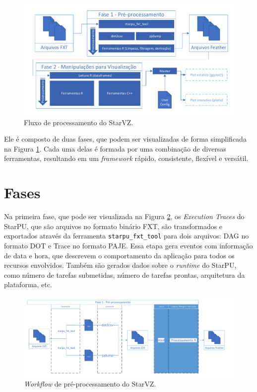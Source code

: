 \begin{figure}[ht]
 \centerline{\includegraphics[width=1\textwidth]{./img/all-proc.pdf}}
 \caption{Fluxo de processamento do StarVZ.}
 \label{fig:starvz-workflow-general}
\end{figure}

Ele é composto de duas fases, que podem ser visualizadas de forma simplificada na Figura \ref{fig:starvz-workflow-general}.
Cada uma delas é formada por uma combinação de diversas ferramentas, resultando em um 
\emph{framework} rápido, consistente, flexível e versátil.



\section{Fases}\label{sect:starvz-phases}

Na primeira fase, que pode ser visualizada na Figura \ref{fig:starvz-workflow1}, os 
\emph{Execution Traces} do StarPU, que são arquivos no formato binário FXT, são 
transformados e exportados através da ferramenta \texttt{starpu\_fxt\_tool} para dois 
arquivos: DAG no formato DOT e Trace no formato PAJE. Essa etapa gera eventos com informação de data e hora, 
que descrevem o comportamento da aplicação para todos os recursos envolvidos. 
Também são gerados dados sobre o \emph{runtime} do StarPU, como número de tarefas submetidas,
número de tarefas prontas, arquitetura da plataforma, etc.

\begin{figure}[ht]
 \centerline{\includegraphics[width=1\textwidth]{./img/step1-simpler.pdf}}
 \caption{\emph{Workflow} de pré-processamento do StarVZ.}
 \label{fig:starvz-workflow1}
\end{figure}

